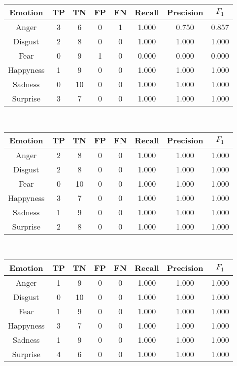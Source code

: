\documentclass[a4paper]{article}
\begin{document}
\begin{center}
  \begin{tabular}{c|cccc|ccc}
  \hline
    Emotion & TP & TN & FP & FN & Recall & Precision & $F_1$ \\
    \hline
   Anger & 3 & 6 & 0 & 1	 & 1.000 & 0.750 & 0.857\\
Disgust & 2 & 8 & 0 & 0	 & 1.000 & 1.000 & 1.000\\
Fear & 0 & 9 & 1 & 0	 & 0.000 & 0.000 & 0.000\\
Happyness & 1 & 9 & 0 & 0	 & 1.000 & 1.000 & 1.000\\
Sadness & 0 & 10 & 0 & 0	 & 1.000 & 1.000 & 1.000\\
Surprise & 3 & 7 & 0 & 0	 & 1.000 & 1.000 & 1.000\\
  \end{tabular}\\
  
  \begin{tabular}{c|cccc|ccc}
  \hline
    Emotion & TP & TN & FP & FN & Recall & Precision & $F_1$ \\
    \hline
    Anger & 2 & 8 & 0 & 0	 & 1.000 & 1.000 & 1.000\\
Disgust & 2 & 8 & 0 & 0	 & 1.000 & 1.000 & 1.000\\
Fear & 0 & 10 & 0 & 0	 & 1.000 & 1.000 & 1.000\\
Happyness & 3 & 7 & 0 & 0	 & 1.000 & 1.000 & 1.000\\
Sadness & 1 & 9 & 0 & 0	 & 1.000 & 1.000 & 1.000\\
Surprise & 2 & 8 & 0 & 0	 & 1.000 & 1.000 & 1.000\\
  \end{tabular}\\
  
  \begin{tabular}{c|cccc|ccc}
  \hline
    Emotion & TP & TN & FP & FN & Recall & Precision & $F_1$ \\
    \hline
    Anger & 1 & 9 & 0 & 0	 & 1.000 & 1.000 & 1.000\\
Disgust & 0 & 10 & 0 & 0	 & 1.000 & 1.000 & 1.000\\
Fear & 1 & 9 & 0 & 0	 & 1.000 & 1.000 & 1.000\\
Happyness & 3 & 7 & 0 & 0	 & 1.000 & 1.000 & 1.000\\
Sadness & 1 & 9 & 0 & 0	 & 1.000 & 1.000 & 1.000\\
Surprise & 4 & 6 & 0 & 0	 & 1.000 & 1.000 & 1.000\\
  \end{tabular}\\
  

\end{center}
\end{document}
